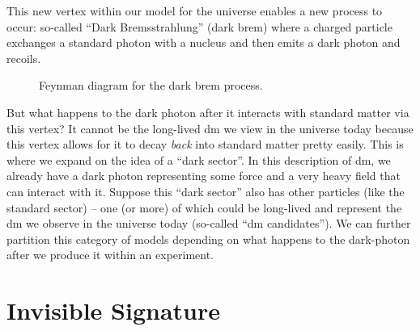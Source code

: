 This new vertex within our model for the universe enables a new process to occur: so-called
``Dark Bremsstrahlung'' (dark brem) where a charged particle exchanges a standard photon with
a nucleus and then emits a dark photon and recoils.

\begin{figure}
  \centering
  \caption{
    Feynman diagram for the dark brem process.
  }
  \label{fig:dark-brem-feynman}
\end{figure}

But what happens to the dark photon after it interacts with standard matter via this vertex? It
cannot be the long-lived \gls{dm} we view in the universe today because this vertex allows for it
to decay \emph{back} into standard matter pretty easily. This is where we expand on the idea of a
``dark sector''. In this description of \gls{dm}, we already have a dark photon representing some
force and a very heavy field that can interact with it. Suppose this ``dark sector'' also has other
particles (like the standard sector) -- one (or more) of which could be long-lived and represent
the \gls{dm} we observe in the universe today (so-called ``\gls{dm} candidates''). We can further
partition this category of models depending on what happens to the \gls{dark-photon} after we
produce it within an experiment.

\section{Invisible Signature}

